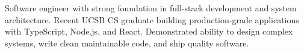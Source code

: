 \documentclass[12pt, letterpaper]{russell}
\begin{document}
\makecvheader

\vspace{-.6cm}

\vspace{-0.05cm}
\begin{cvsummary}
Software engineer with strong foundation in full-stack development and system architecture. Recent UCSB CS graduate building production-grade applications with TypeScript, Node.js, and React. Demonstrated ability to design complex systems, write clean maintainable code, and ship quality software.
\end{cvsummary}

\vspace{-0.05cm}
\end{document}
